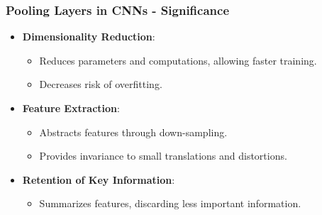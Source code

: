 \documentclass{beamer}
\begin{document}
\begin{frame}[fragile]
    \frametitle{Pooling Layers in CNNs - Significance}
    \begin{itemize}
        \item \textbf{Dimensionality Reduction}: 
            \begin{itemize}
                \item Reduces parameters and computations, allowing faster training.
                \item Decreases risk of overfitting.
            \end{itemize}
        \item \textbf{Feature Extraction}: 
            \begin{itemize}
                \item Abstracts features through down-sampling.
                \item Provides invariance to small translations and distortions.
            \end{itemize}
        \item \textbf{Retention of Key Information}: 
            \begin{itemize}
                \item Summarizes features, discarding less important information.
            \end{itemize}
    \end{itemize}
\end{frame}
\end{document}

